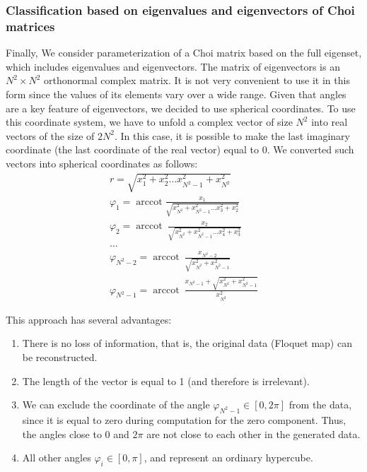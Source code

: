 \documentclass[%
 aip,
 floatfix,
 amsmath,amssymb,
 reprint,%
]{revtex4-1}
\DeclareMathOperator{\arccot}{arccot}
\begin{document}
\subsubsection{Classification based on eigenvalues and eigenvectors of Choi matrices}
Finally, We consider parameterization of a Choi matrix based on the full eigenset, which includes  eigenvalues and eigenvectors. The matrix of eigenvectors is an $N^2 \times N^2$ orthonormal complex matrix. It is not very convenient to use it in this form since the values of its elements vary over a wide range. Given that angles are a key feature of eigenvectors, we decided to use spherical coordinates. To use this coordinate system, we have to unfold a complex vector of size $N^2$ into real vectors of the size of $2N^2$. In this case, it is possible to make the last imaginary coordinate (the last coordinate of the real vector) equal to 0. We converted such vectors into spherical coordinates as follows: 
\begin{equation*}
    \begin{gathered} 
r = \sqrt{x^2_1 + x^2_2 \dots x^2_{N^2-1} + x^2_{N^2}} \\ 
\varphi_1 =  \arccot  \frac{x_1}{\sqrt{x^2_{N^2} + x^2_{{N^2}-1} \dots x^2_3 + x^2_2}}\\ 
\varphi_2 =  \arccot  \ \frac{x_2}{\sqrt{x^2_{N^2} + x^2_{{N^2}-1} \dots x^2_4 + x^2_3}}\\
\dots \\ 
\varphi_{N^2-2} =  \arccot  \ \frac{x_{N^2-2}}{\sqrt{x^2_{N^2} + x^2_{N^2-1}}}\\ \varphi_{N^2-1} =  \arccot  \ \frac{x_{N^2-1} + \sqrt{x^2_{N^2} + x^2_{N^2-1}}}{x^2_{N^2}}
\end{gathered}
\end{equation*}

This approach has several advantages: 
\begin{enumerate}
  \item  There is no loss of information, that is, the original data (Floquet map) can be reconstructed.
  \item  The length of the vector is equal to 1 (and therefore is irrelevant). 
  \item  We can exclude  the coordinate of the angle $\varphi_{N^2-1} \in [0,2\pi]$ from the data, since it is equal to zero during computation for the zero component. Thus, the angles close to 0 and $2\pi$ are not close to each other in the generated data. 
  \item  All other angles $\varphi_i \in [0,\pi]$, and represent an ordinary hypercube.
\end{enumerate}
\end{document}
